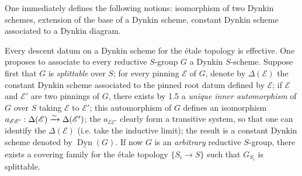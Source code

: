 One immediately defines the following notions: isomorphism of two Dynkin schemes, extension of the base of a Dynkin scheme, constant Dynkin scheme associated to a Dynkin diagram.

Every descent datum on a Dynkin scheme for the étale topology is effective.
\label{XXIV.3.3}
One proposes to associate to every reductive $S$-group $G$ a Dynkin $S$-scheme. Suppose first that $G$ is \emph{splittable} over $S$; for every pinning $\mathscr E$ of $G$, denote by $\Delta(\mathscr E)$ the constant Dynkin scheme associated to the pinned root datum defined by $\mathscr E$; if $\mathscr E$ and $\mathscr E'$ are two pinnings of $G$, there exists by 1.5 a \emph{unique inner automorphism} of $G$ over $S$ taking $\mathscr E$ to $\mathscr E'$; this automorphism of $G$ defines an isomorphism $a_{\mathscr E\mathscr E'}:\Delta(\mathscr E)\xrightarrow{\sim}\Delta(\mathscr E')$; the $a_{\mathscr E\mathscr E'}$ clearly form a transitive system, so that one can identify the $\Delta(\mathscr E)$ (i.e. take the inductive limit); the result is a constant Dynkin scheme denoted by $\underline{\operatorname{Dyn}}(G)$. If now $G$ is an \emph{arbitrary} reductive $S$-group, there exists a covering family for the étale topology $\{S_i\to S\}$ such that $G_{S_i}$ is splittable.
